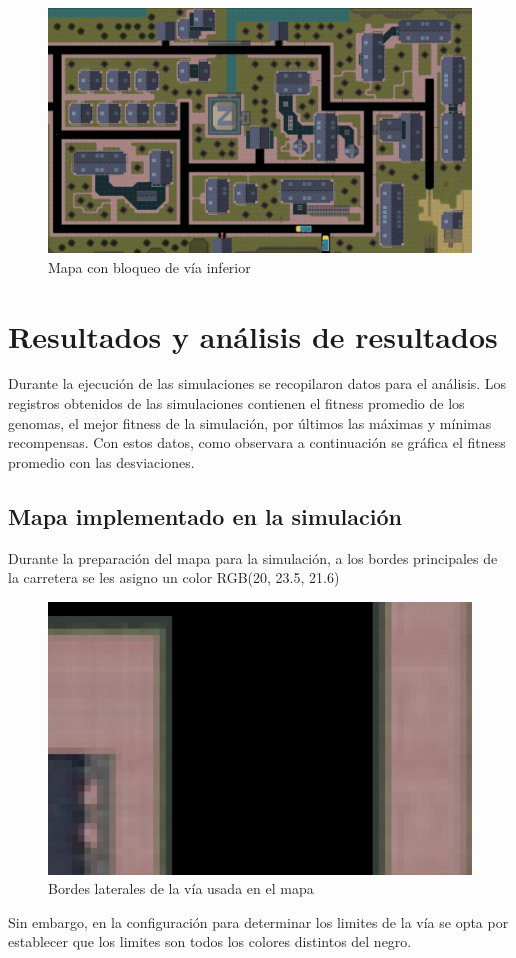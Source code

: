 \documentclass[conference]{IEEEtran}
\begin{document}
\begin{figure}[H]
    \centering    \includegraphics[width=0.8\linewidth]{Simulacion/gta.png}
    \caption{Mapa con bloqueo de vía inferior}
    \label{fig:mapa2}
\end{figure}

\section{Resultados y análisis de resultados}
Durante la ejecución de las simulaciones se recopilaron datos para el análisis. Los registros obtenidos de las simulaciones contienen el fitness promedio de los genomas, el mejor fitness de la simulación, por últimos las máximas y mínimas recompensas. Con estos datos, como observara a continuación se gráfica el fitness promedio con las desviaciones.

\subsection{Mapa implementado en la simulación}
Durante la preparación del mapa para la simulación, a los bordes principales de la carretera se les asigno un color RGB(20, 23.5, 21.6)
\begin{figure}[ht]
    \centering    \includegraphics[width=0.6\linewidth]{Simulacion/Bordes.png}
    \caption{Bordes laterales de la vía usada en el mapa}
    \label{fig:Bordes}
\end{figure}
Sin embargo, en la configuración para determinar los limites de la vía se opta por establecer que los limites son todos los colores distintos del negro.
\end{document}
